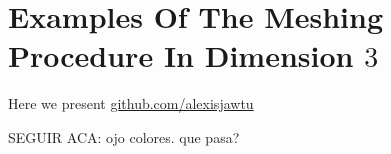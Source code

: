 \section{Examples Of The Meshing Procedure In Dimension $3$} %
\label{sec:examples_of_the_meshing_procedure}

Here we present
\href{https://github.com/alexisjawtu/mesher}{github.com/alexisjawtu}


\tauZero
{}
\tauOneEnCube
\tauOneEn

\conform



SEGUIR ACA: ojo colores. que pasa?



